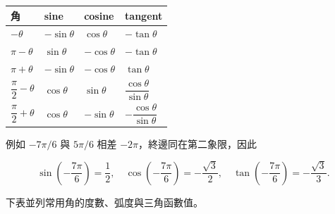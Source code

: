 \documentclass[11pt,a4paper]{article}
\newcounter{none}
\begin{document}
{\def\LTcaptype{none} %
\begin{longtable}[]{@{}
  >{\raggedright\arraybackslash}p{}
  >{\raggedright\arraybackslash}p{}
  >{\raggedright\arraybackslash}p{}
  >{\raggedright\arraybackslash}p{}@{}}
\toprule\noalign{}
\begin{minipage}[b]{\linewidth}\raggedright
角
\end{minipage} & \begin{minipage}[b]{\linewidth}\raggedright
sine
\end{minipage} & \begin{minipage}[b]{\linewidth}\raggedright
cosine
\end{minipage} & \begin{minipage}[b]{\linewidth}\raggedright
tangent
\end{minipage} \\
\midrule\noalign{}
\endhead
\bottomrule\noalign{}
\endlastfoot
\(-\theta\) & \(-\sin\theta\) & \(\cos\theta\) & \(-\tan\theta\) \\
\(\pi-\theta\) & \(\sin\theta\) & \(-\cos\theta\) & \(-\tan\theta\) \\
\(\pi+\theta\) & \(-\sin\theta\) & \(-\cos\theta\) & \(\tan\theta\) \\
\(\dfrac\pi2-\theta\) & \(\cos\theta\) & \(\sin\theta\) & \(\dfrac{\cos\theta}{\sin\theta}\) \\
\(\dfrac\pi2+\theta\) & \(\cos\theta\) & \(-\sin\theta\) & \(-\dfrac{\cos\theta}{\sin\theta}\) \\
\end{longtable}
}

例如 \(-7\pi/6\) 與 \(5\pi/6\) 相差 \(-2\pi\)，終邊同在第二象限，因此

\[
\sin\left(-\frac{7\pi}{6}\right)=\frac12,
\quad
\cos\left(-\frac{7\pi}{6}\right)=-\frac{\sqrt3}{2},
\quad
\tan\left(-\frac{7\pi}{6}\right)=-\frac{\sqrt3}{3}.
\]

下表並列常用角的度數、弧度與三角函數值。
\end{document}
